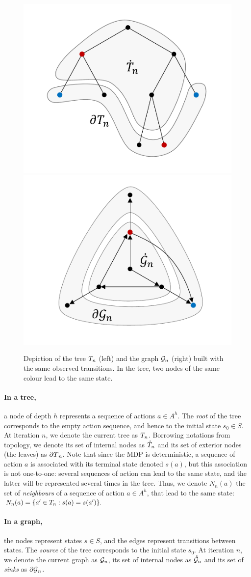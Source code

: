 \documentclass[runningheads]{llncs}
\begin{document}
\begin{figure}[tp]
	\centering
	\includegraphics[trim={1.8cm 1.2cm 1.9cm 1.2cm}, clip,width=0.44\linewidth]{img/tree_1}
	\hfill
	\includegraphics[trim={1.8cm 1.2cm 1.9cm 0.9cm}, clip,width=0.44\linewidth]{img/graph_1}
	\caption{Depiction of the tree $T_n$ (left) and the graph $\mathcal{G}_n$ (right) built with the same observed transitions. In the tree, two nodes of the same colour lead to the same state.}
	\label{fig:structures}
\end{figure}

\paragraph{In a tree,} a node of depth $h$ represents a sequence of actions $a\in A^h$. The \textit{root} of the tree corresponds to the empty action sequence, and hence to the initial state $s_0\in S$. At iteration $n$, we denote the current tree as $T_n$. Borrowing notations from topology, we denote its set of internal nodes as $\mathring{T}_n$ and its set of exterior nodes (the leaves) as ${\partial T}_n$. Note that since the MDP is deterministic, a sequence of action $a$ is associated with its terminal state denoted $s(a)$, but this association is not one-to-one: several sequences of action can lead to the same state, and the latter will be represented several times in the tree. Thus, we denote $N_n(a)$ the set of \emph{neighbours} of a sequence of action $a\in A^h$, that lead to the same state:  $N_n(a) = \{a'\in T_n: s(a)=s(a')\}.$

\paragraph{In a graph,} the nodes represent states $s\in S$, and the edges represent transitions between states. The \textit{source} of the tree corresponds to the initial state $s_0$. At iteration $n$, we denote the current graph as $\mathcal{G}_n$, its set of internal nodes as $\mathring{\mathcal{G}}_n$ and its set of \textit{sinks} as ${\partial \mathcal{G}}_n$.
\end{document}
